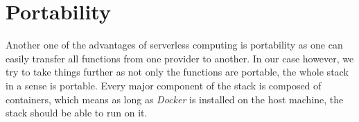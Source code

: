 \section{Portability}

Another one of the advantages of serverless computing is portability as one can easily transfer all
functions from one provider to another. In our case however, we try to take things further as not
only the functions are portable, the whole stack in a sense is portable. Every major component of
the stack is composed of containers, which means as long as \textit{Docker} is installed on the host
machine, the stack should be able to run on it.

